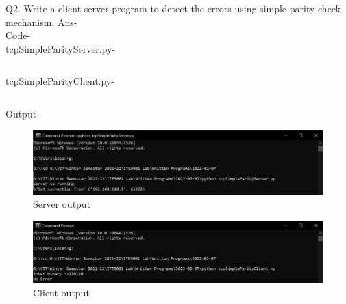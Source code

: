 \documentclass[12pt]{article}
\begin{document}
Q2. Write a client server program to detect the errors using simple parity check mechanism. \newline
Ans- \\ Code- \\ tcpSimpleParityServer.py-\inputminted{python}{tcpSimpleParityServer.py}
tcpSimpleParityClient.py- \inputminted{python}{tcpSimpleParityClient.py}
\newpage
Output-
\begin{figure}[h] %
\centering
\includegraphics[width=\textwidth]{tcpSimpleParityServer.png}
\caption{Server output}
\end{figure}
\begin{figure}[h] %
\centering
\includegraphics[width=\textwidth]{tcpSimpleParityClient.png}
\caption{Client output}
\end{figure}
\newline
\end{document}
